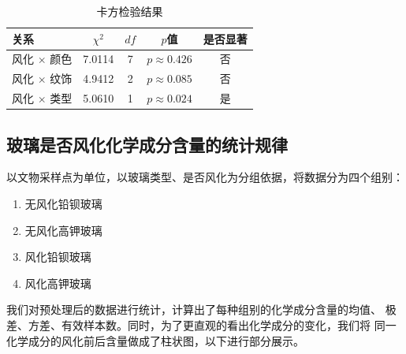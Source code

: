 \documentclass[withoutpreface,bwprint]{cumcmthesis}
\begin{document}
\begin{table}[htbp]
    \centering
    \caption{卡方检验结果}
    \begin{tabular}{lcccc}
        \toprule
        关系 & $\chi^2$ & $df$ & $p$值 &  是否显著 \\
        \midrule
        风化 $\times$ 颜色 & 7.0114 & 7 & $p \approx 0.426$ & 否 \\
        风化 $\times$ 纹饰 & 4.9412 & 2 & $p \approx 0.085$ & 否 \\
        风化 $\times$ 类型 & 5.0610 & 1 & $p \approx 0.024$ & 是 \\
        \bottomrule
    \end{tabular}
\end{table}

\subsection{玻璃是否风化化学成分含量的统计规律}

以文物采样点为单位，以玻璃类型、是否风化为分组依据，将数据分为四个组别：

\begin{enumerate}
    \item 无风化铅钡玻璃
    \item 无风化高钾玻璃
    \item 风化铅钡玻璃
    \item 风化高钾玻璃
\end{enumerate}

我们对预处理后的数据进行统计，计算出了每种组别的化学成分含量的均值、
极差、方差、有效样本数。同时，为了更直观的看出化学成分的变化，我们将
同一化学成分的风化前后含量做成了柱状图，以下进行部分展示。
\end{document}
